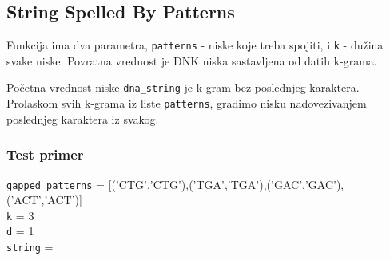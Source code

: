

\subsection{String Spelled By Patterns}

Funkcija ima dva parametra, \texttt{patterns} - niske koje treba spojiti, i \texttt{k} - dužina svake niske. Povratna vrednost je DNK niska sastavljena od datih k-grama.

Početna vrednost niske \texttt{dna\_string} je k-gram bez poslednjeg karaktera. Prolaskom svih k-grama iz liste \texttt{patterns}, gradimo nisku nadovezivanjem poslednjeg karaktera iz svakog.




\subsubsection{Test primer}

\noindent\texttt{gapped\_patterns} = [('CTG','CTG'),('TGA','TGA'),('GAC','GAC'),('ACT','ACT')]
\\\texttt{k} = 3
\\\texttt{d} = 1
\\\texttt{string} =
